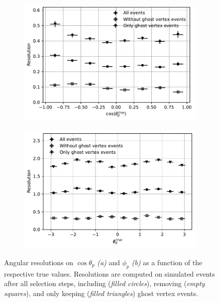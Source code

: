 \begin{figure}[t]
	\centering
	\begin{subfigure}{.45\textwidth}
		\includegraphics[width=\textwidth]{graphics/05-angular_distributions/MCRECO_p_theta_resolution_nocross.pdf}
		\caption{}
		\label{fig:5:theta_resolution_nocross}
	\end{subfigure}
	\begin{subfigure}{.45\textwidth}
		\includegraphics[width=\textwidth]{graphics/05-angular_distributions/MCRECO_p_phi_resolution_nocross.pdf}
		\caption{}
		\label{fig:5:phi_resolution_nocross}
	\end{subfigure}
	\caption{Angular resolutions on $\cos\theta_p$ \textit{(a)} and $\phi_p$ \textit{(b)} as a function of the respective true values. Resolutions are computed on simulated \demonstratorshort events after all selection steps, including (\textit{filled circles}), removing (\textit{empty squares}), and only keeping (\textit{filled triangles}) \lambdadecay ghost vertex events.}
	\label{fig:5:resolution_nocross}
\end{figure}

